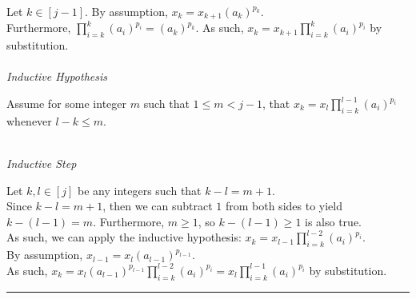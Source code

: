 \documentclass[a4paper,12pt]{article}
\begin{document}
\noindent Let $k \in [j - 1]$. By assumption, $x_k = x_{k + 1}(a_k)^{p_k}$.\\

\noindent Furthermore, $\displaystyle \prod_{i = k}^{k}(a_i)^{p_i} = (a_k)^{p_k}$. As such, $\displaystyle x_k = x_{k + 1} \prod_{i = k}^{k}(a_i)^{p_i}$ by substitution.\\


\noindent \\
\textit{Inductive Hypothesis}

\noindent Assume for some integer $m$ such that $1 \leq m < j - 1$, that $\displaystyle x_k = x_l \prod_{i = k}^{l - 1} (a_i)^{p_i}$ whenever $l - k \leq m$.

\noindent \\
\textit{Inductive Step}

\noindent Let $k, l \in [j]$ be any integers such that $k - l = m + 1$.\\

\noindent Since $k - l = m + 1$, then we can subtract $1$ from both sides to yield $k - (l - 1) = m$. Furthermore, $m \geq 1$, so $k - (l - 1) \geq 1$ is also true.\\

\noindent As such, we can apply the inductive hypothesis: $\displaystyle x_k = x_{l - 1} \prod_{i = k}^{l - 2}(a_i)^{p_i}$.\\

\noindent By assumption, $x_{l - 1} = x_l(a_{l - 1})^{p_{l - 1}}$.\\

\noindent As such, $\displaystyle x_k = x_l(a_{l - 1})^{p_{l - 1}} \prod_{i = k}^{l - 2}(a_i)^{p_i} = x_l \prod_{i = k}^{l - 1}(a_i)^{p_i}$ by substitution.

\begin{center}
\noindent\rule{8cm}{0.4pt}
\end{center}
\noindent \\
\end{document}
